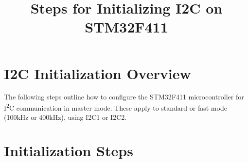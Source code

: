 \documentclass[12pt]{article}
\title{Steps for Initializing I2C on STM32F411}
\author{}
\date{}
\begin{document}
\maketitle

\section*{I2C Initialization Overview}

The following steps outline how to configure the STM32F411 microcontroller for I\textsuperscript{2}C communication in master mode. These apply to standard or fast mode (100kHz or 400kHz), using I2C1 or I2C2.

\section*{Initialization Steps}
\end{document}
